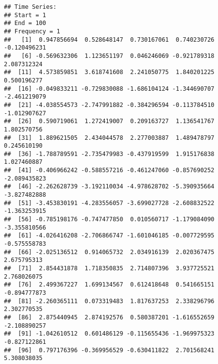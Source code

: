 \documentclass[
]{article}
\begin{document}
\begin{verbatim}
## Time Series:
## Start = 1 
## End = 100 
## Frequency = 1 
##   [1]  0.947856694  0.528648147  0.730167061  0.740230726 -0.120496231
##   [6] -0.569632306  1.123651197  0.046246069 -0.921789318  2.087312324
##  [11]  4.573859851  3.618741608  2.241050775  1.840201225  0.500196277
##  [16] -0.049833211 -0.729830088 -1.686104124 -1.344690707 -2.461219079
##  [21] -4.038554573 -2.747991882 -0.384296594 -0.113784510 -1.012907627
##  [26]  0.590719061  1.272419007  0.209163727  1.136541767  1.802570756
##  [31]  1.889621505  2.434044578  2.277003887  1.489478797  0.245610190
##  [36] -1.788789591 -2.735479983 -0.437919599  1.915176838  1.027460887
##  [41] -0.406966242 -0.588557216 -0.461247060 -0.857690252 -2.089435823
##  [46] -2.262628739 -3.192110034 -4.978628702 -5.390935664 -3.827482888
##  [51] -3.453830191 -4.283556057 -3.699027728 -2.608832522 -1.363253915
##  [56] -0.785198176 -0.747477850  0.010560717 -1.179084090 -3.355810566
##  [61] -4.026416208 -2.706866747 -1.601046185 -0.007729595 -0.575558783
##  [66] -2.025136512  0.914065732  2.034916139  2.020367475  2.675795313
##  [71]  2.854431878  1.718350835  2.714807396  3.937725521  2.768026075
##  [76]  2.499367227  1.699134567  0.612418648  0.541665151 -0.894777873
##  [81] -2.260365111  0.073319483  1.817637253  2.338296796  2.302770535
##  [86]  2.875440945  2.874192576  0.580387201 -1.616552659 -2.108890257
##  [91] -1.042610512  0.601486129 -0.115655436 -1.969975323 -0.827122861
##  [96]  0.797176396 -0.369956529 -0.630411822  2.701568241  5.308038035
\end{verbatim}
\end{document}
